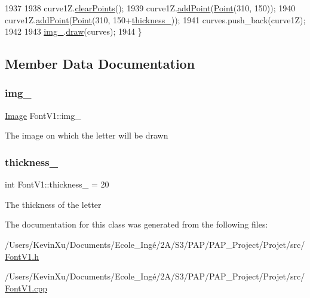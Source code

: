 \begin{DoxyCode}
1937 
1938     curve1Z.\mbox{\hyperlink{class_bezier_curve_a0ba8ce66d5af5971ae6a1b506029728e}{clearPoints}}();
1939     curve1Z.\mbox{\hyperlink{class_bezier_curve_a38d16c18b36ae45619b05e26e226cf34}{addPoint}}(\mbox{\hyperlink{class_point}{Point}}(310, 150));
1940     curve1Z.\mbox{\hyperlink{class_bezier_curve_a38d16c18b36ae45619b05e26e226cf34}{addPoint}}(\mbox{\hyperlink{class_point}{Point}}(310, 150+\mbox{\hyperlink{class_font_v1_aed8040e76be9a52833627b92f0fb4e5f}{thickness\_}}));
1941     curves.push\_back(curve1Z);
1942 
1943     \mbox{\hyperlink{class_font_v1_a00569e3e3c4b70f437b63f396f735fb0}{img\_}}.\mbox{\hyperlink{class_image_a8d162f3cab956131d58708c09aa560b0}{draw}}(curves);
1944 \}
\end{DoxyCode}


\subsection{Member Data Documentation}
\mbox{\label{class_font_v1_a00569e3e3c4b70f437b63f396f735fb0}} 
\subsubsection{\texorpdfstring{img\+\_\+}{img\_}}
{\footnotesize\ttfamily \mbox{\hyperlink{class_image}{Image}} Font\+V1\+::img\+\_\+\hspace{0.3cm}{\ttfamily [protected]}}

The image on which the letter will be drawn \mbox{\label{class_font_v1_aed8040e76be9a52833627b92f0fb4e5f}} 
\subsubsection{\texorpdfstring{thickness\+\_\+}{thickness\_}}
{\footnotesize\ttfamily int Font\+V1\+::thickness\+\_\+ = 20\hspace{0.3cm}{\ttfamily [protected]}}

The thickness of the letter 

The documentation for this class was generated from the following files\+:\begin{DoxyCompactItemize}
\item 
/\+Users/\+Kevin\+Xu/\+Documents/\+Ecole\+\_\+\+Ingé/2\+A/\+S3/\+P\+A\+P/\+P\+A\+P\+\_\+\+Project/\+Projet/src/\mbox{\hyperlink{_font_v1_8h}{Font\+V1.\+h}}\item 
/\+Users/\+Kevin\+Xu/\+Documents/\+Ecole\+\_\+\+Ingé/2\+A/\+S3/\+P\+A\+P/\+P\+A\+P\+\_\+\+Project/\+Projet/src/\mbox{\hyperlink{_font_v1_8cpp}{Font\+V1.\+cpp}}\end{DoxyCompactItemize}
